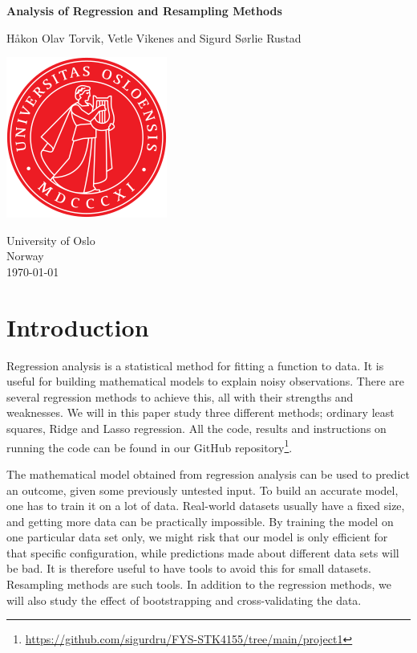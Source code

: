\documentclass[reprint,english,notitlepage,aps,nobalancelastpage,nofootinbib]{revtex4-1}  %
\begin{document}
\begin{titlepage}
	\begin{center}
	\textbf{Analysis of Regression and Resampling Methods}

	\vspace{0.2cm}
	Håkon Olav Torvik, Vetle Vikenes and Sigurd Sørlie Rustad

	\vspace{0.5cm}
	\includegraphics[scale=0.5]{../../pictures/UIO}
	\vspace{0.8cm}

	University of Oslo\\
	Norway\\
	\today	\\
	\end{center}
	\tableofcontents
	\clearpage
\end{titlepage}

\onecolumngrid
\section*{Introduction}

Regression analysis is a statistical method for fitting a function to data. It is useful for building mathematical models to explain noisy observations. There are several regression methods to achieve this, all with their strengths and weaknesses. We will in this paper study three different methods; ordinary least squares, Ridge and Lasso regression. All the code, results and instructions on running the code can be found in our GitHub repository\footnote{\href{https://github.com/sigurdru/FYS-STK4155/tree/main/project1}{https://github.com/sigurdru/FYS-STK4155/tree/main/project1}}.

The mathematical model obtained from regression analysis can be used to predict an outcome, given some previously untested input. To build an accurate model, one has to train it on a lot of data. Real-world datasets usually have a fixed size, and getting more data can be practically impossible. By training the model on one particular data set only, we might risk that our model is only efficient for that specific configuration, while predictions made about different data sets will be bad. It is therefore useful to have tools to avoid this for small datasets. Resampling methods are such tools. In addition to the regression methods, we will also study the effect of bootstrapping and cross-validating the data.
\end{document}
